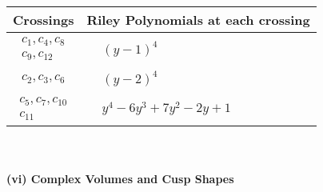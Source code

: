 \documentclass[1p]{elsarticle_modified}
\theoremstyle{definition}
\begin{document}
\begin{tabular}{m{50pt}|m{274pt}}
Crossings & \hspace{64pt}Riley Polynomials at each crossing \\
\hline $$\begin{aligned}c_{1},c_{4},c_{8}\\c_{9},c_{12}\end{aligned}$$&$\begin{aligned}
&(y-1)^4
\end{aligned}$\\
\hline $$\begin{aligned}c_{2},c_{3},c_{6}\end{aligned}$$&$\begin{aligned}
&(y-2)^4
\end{aligned}$\\
\hline $$\begin{aligned}c_{5},c_{7},c_{10}\\c_{11}\end{aligned}$$&$\begin{aligned}
&y^4-6 y^3+7 y^2-2 y+1
\end{aligned}$\\
\hline
\end{tabular}\\~\\
\newpage\flushleft \textbf{(vi) Complex Volumes and Cusp Shapes}
\end{document}
